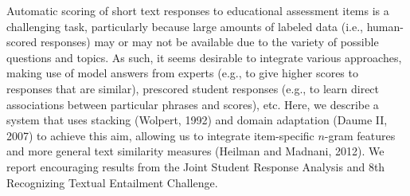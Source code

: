Automatic scoring of short text responses to educational assessment items is a challenging task, particularly because large amounts of labeled data (i.e.,
 human-scored responses) may or may not be available due to the variety of
 possible questions and topics.               As such, it seems desirable to integrate
 various approaches, making use of model answers from experts (e.g., to give
 higher scores to responses that are similar), prescored student responses
 (e.g., to learn direct associations between particular phrases and scores),
 etc. Here, we describe a system that uses stacking (Wolpert, 1992) and domain
 adaptation (Daume II, 2007) to achieve this aim, allowing us to integrate
 item-specific $n$-gram features and more general text similarity measures
 (Heilman and Madnani, 2012). We report encouraging results from the Joint
 Student Response Analysis and 8th Recognizing Textual Entailment Challenge.


